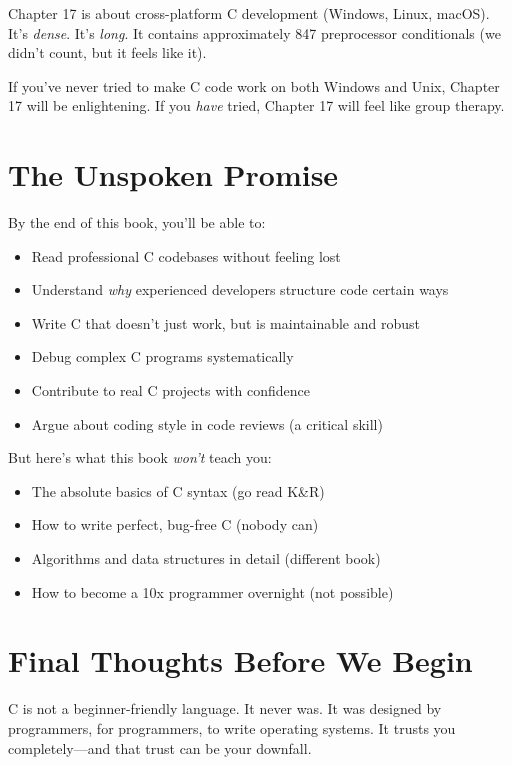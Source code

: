 \documentclass[11pt,openany]{book}
\begin{document}
Chapter 17 is about cross-platform C development (Windows, Linux, macOS). It's \textit{dense}. It's \textit{long}. It contains approximately 847 preprocessor conditionals (we didn't count, but it feels like it).

If you've never tried to make C code work on both Windows and Unix, Chapter 17 will be enlightening. If you \textit{have} tried, Chapter 17 will feel like group therapy.

\section*{The Unspoken Promise}

By the end of this book, you'll be able to:
\begin{itemize}
    \item Read professional C codebases without feeling lost
    \item Understand \textit{why} experienced developers structure code certain ways
    \item Write C that doesn't just work, but is maintainable and robust
    \item Debug complex C programs systematically
    \item Contribute to real C projects with confidence
    \item Argue about coding style in code reviews (a critical skill)
\end{itemize}

But here's what this book \textit{won't} teach you:
\begin{itemize}
    \item The absolute basics of C syntax (go read K\&R)
    \item How to write perfect, bug-free C (nobody can)
    \item Algorithms and data structures in detail (different book)
    \item How to become a 10x programmer overnight (not possible)
\end{itemize}

\section*{Final Thoughts Before We Begin}

C is not a beginner-friendly language. It never was. It was designed by programmers, for programmers, to write operating systems. It trusts you completely---and that trust can be your downfall.
\end{document}
